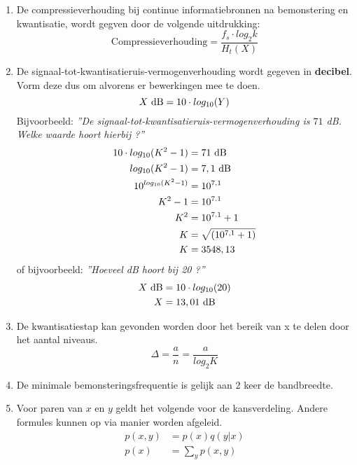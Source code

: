 \documentclass[12pt,a4paper]{article}
\begin{document}
\begin{enumerate}
	\item De compressieverhouding bij continue informatiebronnen na bemonstering en kwantisatie, wordt gegven door de volgende uitdrukking:
	      $$\text{Compressieverhouding} = \frac{f_s \cdot log_2 k}{H_t(X)}$$
	      
	\item De signaal-tot-kwantisatieruis-vermogenverhouding wordt gegeven in \textbf{decibel}. Vorm deze dus om alvorens er bewerkingen mee te doen.
	      $$X \text{ \si{dB}} = 10 \cdot log_{10}(Y) $$
	      Bijvoorbeeld: \textit{''De signaal-tot-kwantisatieruis-vermogenverhouding is $71$ \si{dB}. Welke waarde hoort hierbij ?''}
	      \begin{align*}
	      	10 \cdot log_{10}(K^2 - 1) & = 71 \text{ \si{dB}}    \\
	      	log_{10}(K^2 - 1)          & = 7,1 \text{ \si{dB}}   \\
	      	10^{log_{10}(K^2 - 1)}     & = 10^{7,1}              \\
	      	K^2 - 1                    & = 10^{7.1}              \\
	      	K^2                        & = 10^{7.1} + 1          \\
	      	K                          & = \sqrt{(10^{7,1} + 1)} \\
	      	K                          & = 3548,13               
	      \end{align*}
	      of bijvoorbeeld: \textit{''Hoeveel \si{dB} hoort bij 20 ?''}
	      \begin{align*}
	      	X \text{ \si{dB}} & = 10 \cdot log_{10}(20) \\
	      	X                 & = 13,01 \text{ \si{dB}} 
	      \end{align*}
	      
	\item De kwantisatiestap kan gevonden worden door het bereik van x te delen door het aantal niveaus.
	      $$\Delta = \frac{a}{n} = \frac{a}{log_2 K}$$
	      
	\item De minimale bemonsteringsfrequentie is gelijk aan 2 keer de bandbreedte.
	      
	\item Voor paren van $x$ en $y$ geldt het volgende voor de kansverdeling. Andere formules kunnen op via manier worden afgeleid.
	      \begin{align}
	      	p(x,y) & = p(x)q(y|x) \\ p(x) &= \sum_y p(x,y)
	      \end{align}
	      

\end{enumerate}
\end{document}
